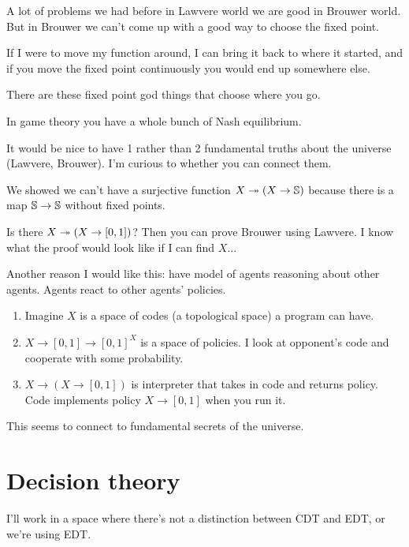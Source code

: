 \documentclass[11pt]{article}
\begin{document}
A lot of problems we had before in Lawvere world we are good in Brouwer world. But in Brouwer we can't come up with a good way to choose the fixed point.

If I were to move my function around, I can bring it back to where it started, and if you move the fixed point continuously you would end up somewhere else.

There are these fixed point god things that choose where you go.

In game theory you have a whole bunch of Nash equilibrium.

It would be nice to have 1 rather than 2 fundamental truths about the universe (Lawvere, Brouwer). I'm curious to whether you can connect them.

We showed we can't have a surjective function $X\twoheadrightarrow (X\to \mathbb{S})$ because there is a map $\mathbb{S}\to \mathbb{S}$ without fixed points.

Is there $X\twoheadrightarrow (X\to [0,1])$? Then you can prove Brouwer using Lawvere.  I know what the proof would look like if I can find $X$...

Another reason I would like this: have model of agents reasoning about other agents. Agents react to other agents' policies.
\begin{enumerate}
\item
Imagine $X$ is a space of codes (a topological space) a program can have.
\item
$X\to [0,1]\to [0,1]^X$ is a space of policies. I look at opponent's code and cooperate with some probability.
\item
 $X\to (X\to [0,1])$ is interpreter that takes in code and returns policy. %
 Code implements policy $X\to [0,1]$ when you run it.
\end{enumerate}

This seems to connect to fundamental secrets of the universe.

\section{Decision theory}

I'll work in a space where there's not a distinction between CDT and EDT, or we're using EDT.




\end{document}
